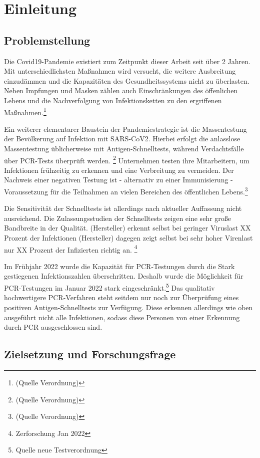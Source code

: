 \chapter{Einleitung}
\section{Problemstellung}
Die Covid19-Pandemie existiert zum Zeitpunkt dieser Arbeit seit über 2 Jahren.
Mit unterschiedlichsten Maßnahmen wird versucht, die weitere Ausbreitung einzudämmen und die Kapazitäten des Gesundheitssystems nicht zu überlasten.
Neben Impfungen und Masken zählen auch Einschränkungen des öffenlichen Lebens und die Nachverfolgung von Infektionsketten zu den ergriffenen Maßnahmen.\footnote{(Quelle Verordnung)}

Ein weiterer elementarer Baustein der Pandemiestrategie ist die Massentestung der Bevölkerung auf Infektion mit SARS-CoV2.
Hierbei erfolgt die anlasslose Massentestung üblicherweise mit Antigen-Schnelltests, während Verdachtsfälle über PCR-Tests überprüft werden.
\footnote{(Quelle Verordnung)}
Unternehmen testen ihre Mitarbeitern, um Infektionen frühzeitig zu erkennen und eine Verbreitung zu vermeiden.
 Der Nachweis einer negativen Testung ist - alternativ zu einer Immunisierung - Voraussetzung für die Teilnahmen an vielen Bereichen des öffentlichen Lebens.\footnote{(Quelle Verordnung)}

Die Sensitivität der Schnelltests ist allerdings nach aktueller Auffassung nicht ausreichend.
Die Zulassungsstudien der Schnelltests zeigen eine sehr große Bandbreite in der Qualität.
(Hersteller) erkennt selbst bei geringer Viruslast XX Prozent der Infektionen
(Hersteller) dagegen zeigt selbst bei sehr hoher Virenlast nur XX Prozent der Infizierten richtig an.
\footnote{Zerforschung Jan 2022}

Im Frühjahr 2022 wurde die Kapazität für PCR-Testungen durch die Stark gestiegenen Infektionszahlen überschritten.
Deshalb wurde die Möglichkeit für PCR-Testungen im Januar 2022 stark eingeschränkt.\footnote{Quelle neue Testverordnung}
Das qualitativ hochwertigere PCR-Verfahren steht seitdem nur noch zur Überprüfung eines positiven Antigen-Schnelltests zur Verfügung.
Diese erkennen allerdings wie oben ausgeführt nicht alle Infektionen, sodass diese Personen von einer Erkennung durch PCR ausgeschlossen sind.

\section{Zielsetzung und Forschungsfrage}

